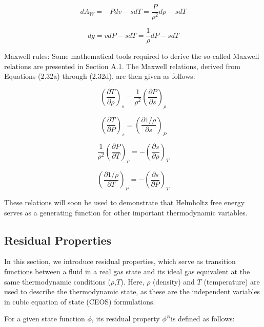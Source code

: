 	\begin{equation}
		dA_W = -Pdv -sdT = \frac{P}{\rho ^2}d\rho - sdT
	\end{equation}

	\begin{equation}
		dg = vdP - sdT = \frac{1}{\rho}dP -sdT
	\end{equation}

	Maxwell rules: Some mathematical tools required to derive the so-called
	Maxwell relations are presented in Section A.1. The Maxwell relations,
	derived from Equations (2.32a) through (2.32d), are then given as follows:

	\begin{equation}
		\left(\frac{\partial T}{\partial \rho}\right)_s = \frac{1}{\rho ^2}\left(\frac{\partial P}{\partial s}\right)_{\rho}
	\end{equation}

	\begin{equation}
		\left(\frac{\partial T}{\partial P}\right)_s = \left(\frac{\partial 1/\rho}{\partial s}\right)_P 
	\end{equation}

	\begin{equation}
		\frac{1}{\rho ^2}\left(\frac{\partial P}{\partial T}\right)_{\rho} = -\left(\frac{\partial s}{\partial \rho}\right)_T
	\end{equation}

	\begin{equation}
		\left(\frac{\partial 1/\rho}{\partial T}\right)_P = -\left(\frac{\partial s}{\partial P}\right)_T
	\end{equation}

	These relations will soon be used to demonstrate that Helmholtz free energy
	serves as a generating function for other important thermodynamic variables.

	\subsection{Residual Properties}

	In this section, we introduce residual properties, which serve as transition
	functions between a fluid in a real gas state and its ideal gas equivalent
	at the same thermodynamic conditions ($\rho$,$T$). Here, $\rho$ (density) and $T$
	(temperature) are used to describe the thermodynamic state, as these are the
	independent variables in cubic equation of state (CEOS) formulations.

For a given state function $\phi$, its residual property $\phi^R$​ is defined as
follows:

